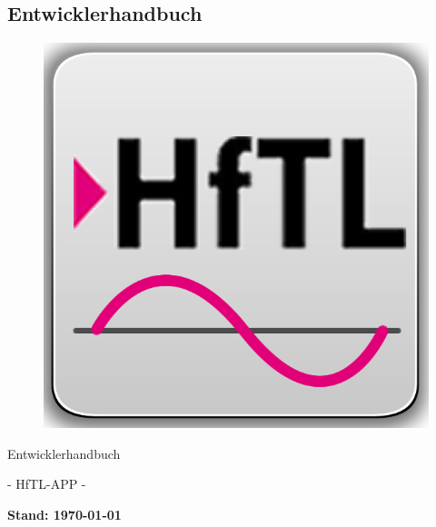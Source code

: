 \newpage
\subsection{Entwicklerhandbuch}

\begin{figure}[h]
	\centering
	\includegraphics[scale=2.5]{03_Bedienungsanleitung/img/Logo_HFTl_App.png}
	\label{img:grafik-dummy}
\end{figure}

\begin{center}
	{\huge Entwicklerhandbuch}
\end{center}

\begin{center}
	{\huge -  HfTL-APP  -}
\end{center}

\begin{center}
	\textbf{{\large Stand: {\today}}}
\end{center}

\newpage
\tableofcontents
\newpage

